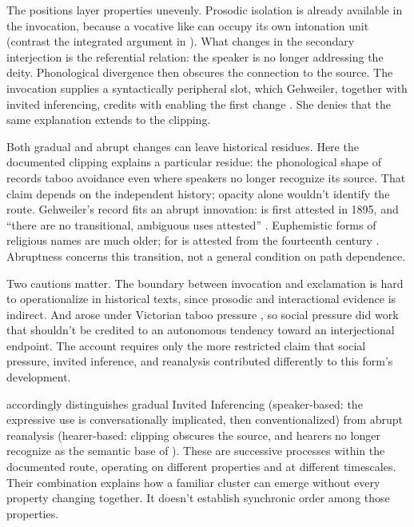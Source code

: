 \documentclass[12pt]{article}
\begin{document}
The positions layer properties unevenly. Prosodic isolation is already available in the invocation, because a vocative like  can occupy its own intonation unit (contrast the integrated argument in ). What changes in the secondary interjection is the referential relation: the speaker is no longer addressing the deity. Phonological divergence then obscures the connection to the source. The invocation supplies a syntactically peripheral slot, which Gehweiler, together with invited inferencing, credits with enabling the first change \citep[85]{gehweiler2008}. She denies that the same explanation extends to the clipping.

Both gradual and abrupt changes can leave historical residues. Here the documented clipping explains a particular residue: the phonological shape of  records taboo avoidance even where speakers no longer recognize its source. That claim depends on the independent history; opacity alone wouldn't identify the route. Gehweiler's record fits an abrupt innovation:  is first attested in 1895, and \enquote{there are no transitional, ambiguous uses attested} \citep[85--86]{gehweiler2008}. Euphemistic forms of religious names are much older;  for  is attested from the fourteenth century \citep[81]{gehweiler2008}. Abruptness concerns this transition, not a general condition on path dependence.

Two cautions matter. The boundary between invocation and exclamation is hard to operationalize in historical texts, since prosodic and interactional evidence is indirect. And  arose under Victorian taboo pressure \citep[85--86]{gehweiler2008}, so social pressure did work that shouldn't be credited to an autonomous tendency toward an interjectional endpoint. The account requires only the more restricted claim that social pressure, invited inference, and reanalysis contributed differently to this form's development.

\textcite[71--72, 88]{gehweiler2008} accordingly distinguishes gradual Invited Inferencing (speaker-based: the expressive use is conversationally implicated, then conventionalized) from abrupt reanalysis (hearer-based: clipping obscures the source, and hearers no longer recognize  as the semantic base of ). These are successive processes within the documented route, operating on different properties and at different timescales. Their combination explains how a familiar cluster can emerge without every property changing together. It doesn't establish synchronic order among those properties.
\end{document}
